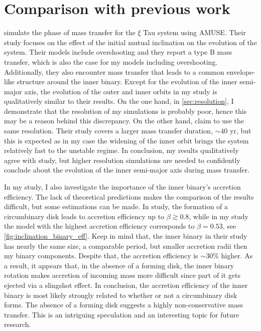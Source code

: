 \section{Comparison with previous work}

\cite{de2014evolution} simulate the phase of mass transfer for the $\xi$ Tau system using AMUSE. Their study focuses on the effect of the initial mutual inclination on the evolution of the system. Their models include overshooting and they report a type B mass transfer, which is also the case for my models including overshooting. Additionally, they also encounter mass transfer that leads to a common envelope-like structure around the inner binary. Except for the evolution of the inner semi-major axis, the evolution of the outer and inner orbits in my study is qualitatively similar to their results. On the one hand, in \cref{sec:resolution}, I demonstrate that the resolution of my simulations is probably poor, hence this may be a reason behind this discrepancy. On the other hand, \cite{de2014evolution} claim to use the same resolution. Their study covers a larger mass transfer duration, $\sim 40$ yr, but this is expected as in my case the widening of the inner orbit brings the system relatively fast to the unstable regime. In conclusion, my results qualitatively agree with \cite{de2014evolution} study, but higher resolution simulations are needed to confidently conclude about the evolution of the inner semi-major axis during mass transfer.

In my study, I also investigate the importance of the inner binary's accretion efficiency. The lack of theoretical predictions makes the comparison of the results difficult, but some estimations can be made. In \cite{zwart2019triple} study, the formation of a circumbinary disk leads to accretion efficiency up to $\beta \gtrsim 0.8$, while in my study the model with the highest accretion efficiency corresponds to $\beta = 0.53$, see \cref{fig:inclination_binary_eff}. Keep in mind that, the inner binary in their study has nearly the same size, a comparable period, but smaller accretion radii then my binary components. Despite that, the accretion efficiency is $\sim 30\%$ higher. As a result, it appears that, in the absence of a forming disk, the inner binary rotation makes accretion of incoming mass more difficult since part of it gets ejected via a slingshot effect. In conclusion, the accretion efficiency of the inner binary is most likely strongly related to whether or not a circumbinary disk forms. The absence of a forming disk suggests a highly non-conservative mass transfer. This is an intriguing speculation and an interesting topic for future research.

